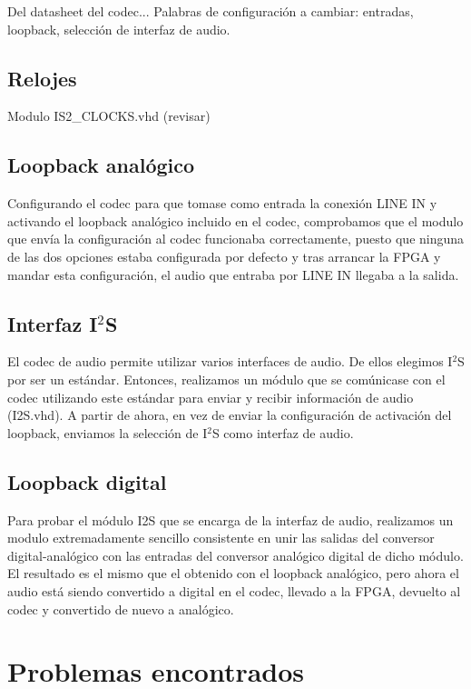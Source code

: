 Del datasheet del codec... Palabras de configuración a cambiar: entradas, loopback, selección de interfaz de audio.


	\subsection{Relojes}

		Modulo IS2\_CLOCKS.vhd (revisar)
	

	\subsection{Loopback analógico}

		Configurando el codec para que tomase como entrada la conexión LINE IN y activando el loopback analógico incluido en el codec, comprobamos que el modulo que envía la configuración al codec funcionaba correctamente, puesto que ninguna de las dos opciones estaba configurada por defecto y tras arrancar la FPGA y mandar esta configuración, el audio que entraba por LINE IN llegaba a la salida.
		
	
	\subsection{Interfaz I$^2$S}

		El codec de audio permite utilizar varios interfaces de audio. De ellos elegimos I$^2$S por ser un estándar. Entonces, realizamos un módulo que se comúnicase con el codec utilizando este estándar para enviar y recibir información de audio (I2S.vhd). A partir de ahora, en vez de enviar la configuración de activación del loopback, enviamos la selección de I$^2$S como interfaz de audio.

	\subsection{Loopback digital}
		
		Para probar el módulo I2S que se encarga de la interfaz de audio, realizamos un modulo extremadamente sencillo consistente en unir las salidas del conversor digital-analógico con las entradas del conversor analógico digital de dicho módulo. El resultado es el mismo que el obtenido con el loopback analógico, pero ahora el audio está siendo convertido a digital en el codec, llevado a la FPGA, devuelto al codec y convertido de nuevo a analógico.

		

	
\section{Problemas encontrados}

